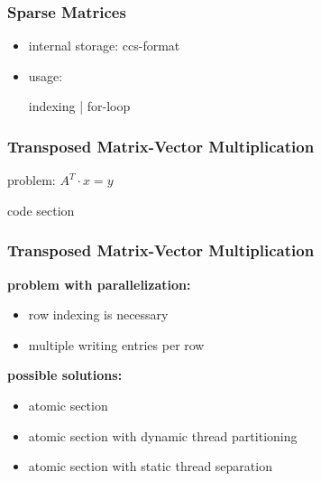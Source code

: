 \documentclass{beamer}
\begin{document}

\begin{frame}
\frametitle{Sparse Matrices}
\begin{itemize}
\item internal storage: ccs-format
\item usage:
\begin{block}{indexing | for-loop}
\codeA
\end{block}
\end{itemize}
\end{frame}



\begin{frame}
\frametitle{Transposed Matrix-Vector Multiplication}
problem: $A^T\cdot x=y$
\begin{block}{code section}
\codeB
\end{block}
\end{frame}


\begin{frame}
\frametitle{Transposed Matrix-Vector Multiplication}
\textbf{problem with parallelization:}
\begin{itemize}
\item row indexing is necessary
\item multiple writing entries per row
\end{itemize}

\textbf{possible solutions:}
\begin{itemize}
\item atomic section
\item atomic section with dynamic thread partitioning \codeC
\item atomic section with static thread separation
\end{itemize}
\end{frame}
\end{document}
